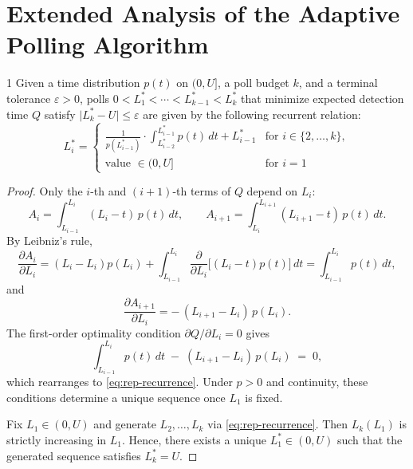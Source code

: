 \appendix

\section{Extended Analysis of the Adaptive Polling Algorithm}
\label{app:rasc-proofs}

\begin{reptheorem}{1}
Given a time distribution $p(t)$ on $(0,U]$, a poll budget $k$, and a terminal tolerance $\varepsilon>0$,
polls
$0<{L_1^{\!*}}<\cdots<L_{k-1}^{\!*}<L_k^{\!*}$
that minimize
expected detection time $Q$ satisfy $\lvert L_k^{\!*}-U\rvert\le\varepsilon$ are given by the following recurrent relation:
\[
L_i^{\!*} =
\begin{cases} 
\frac{1}{p(L_{i-1}^{\!*})} \cdot \int_{L_{i-2}^{\!*}}^{L_{i-1}^{\!*}} p(t)\, dt + L_{i-1}^{\!*} & \text{for } i \in \{2,\dots,k\}, \\
\text{value } \in (0,U] & \text{for } i=1
\end{cases} \tag{5} \label{eq:rep-recurrence}
\]
\end{reptheorem}

\begin{proof}
Only the $i$-th and $(i+1)$-th terms of $Q$ depend on $L_i$:
\[
A_i=\int_{L_{i-1}}^{L_i} (L_i-t)\,p(t)\,dt,\qquad
A_{i+1}=\int_{L_i}^{L_{i+1}} (L_{i+1}-t)\,p(t)\,dt.
\]
By Leibniz’s rule,
\[
\frac{\partial A_i}{\partial L_i}
= (L_i{-}L_i)p(L_i) + \int_{L_{i-1}}^{L_i} \frac{\partial}{\partial L_i}\big[(L_i{-}t)p(t)\big]\,dt
= \int_{L_{i-1}}^{L_i} p(t)\,dt,
\]
and
\[
\frac{\partial A_{i+1}}{\partial L_i}
= -\,(L_{i+1}-L_i)\,p(L_i).
\]
The first-order optimality condition $\partial Q/\partial L_i=0$ gives
\[
\int_{L_{i-1}}^{L_i} p(t)\,dt \;-\; (L_{i+1}-L_i)\,p(L_i) \;=\;0,
\]
which rearranges to \eqref{eq:rep-recurrence}.
Under $p>0$ and continuity, these conditions determine a unique sequence once $L_1$ is fixed.

Fix $L_1\in(0,U)$ and generate $L_2,\dots,L_k$ via \eqref{eq:rep-recurrence}.
Then $L_k(L_1)$ is strictly increasing in $L_1$.
Hence, there exists a unique $L_1^*\in(0,U)$ such that the generated sequence satisfies $L_k^*=U$.
\end{proof}

